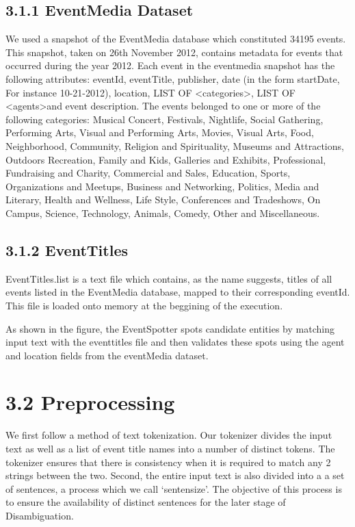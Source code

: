 \documentclass[a4paper,11pt]{report}
\begin{document}
\subsection*{3.1.1 EventMedia Dataset}
We used a snapshot of the EventMedia database which constituted 34195 events. This snapshot, taken on 26th November 2012, contains metadata for events that occurred during the year 2012. Each event in the eventmedia snapshot has the following attributes: eventId, eventTitle, publisher, date (in the form startDate, For instance 10-21-2012), location, LIST OF \textless categories\textgreater, LIST OF \textless agents\textgreater and event description. The events belonged to one or more of the following categories: Musical Concert, Festivals, Nightlife, Social Gathering, Performing Arts, Visual and Performing Arts, Movies, Visual Arts, Food, Neighborhood, Community, Religion and Spirituality, Museums and Attractions, Outdoors Recreation, Family and Kids, Galleries and Exhibits, Professional, Fundraising and Charity, Commercial and Sales, Education, Sports, Organizations and Meetups, Business and Networking, Politics, Media and Literary, Health and Wellness, Life Style, Conferences and Tradeshows, On Campus, Science, Technology, Animals, Comedy, Other and Miscellaneous.

\subsection*{3.1.2 EventTitles}
EventTitles.list is a text file which contains, as the name suggests, titles of all events listed in the EventMedia database, mapped to their corresponding eventId. This file is loaded onto memory at the beggining of the execution.

As shown in the figure, the EventSpotter spots candidate entities by matching input text with the eventtitles file and then validates these spots using the agent and location fields from the eventMedia dataset.

\section*{3.2 Preprocessing}


We first follow a method of text tokenization. Our tokenizer divides the input text as well as a list of event title names into a number of distinct tokens. The tokenizer ensures that there is consistency when it is required to match any 2 strings between the two. Second, the entire input text is also divided into a a set of sentences, a process which we call `sentensize’. The objective of this process is to ensure the availability of distinct sentences for the later stage of Disambiguation.
\end{document}
